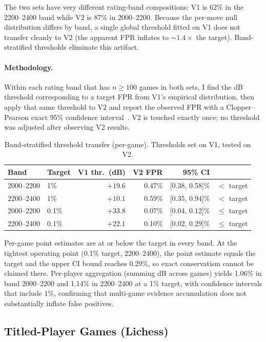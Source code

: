 \documentclass[11pt,a4paper]{article}
\theoremstyle{definition}
\begin{document}
\noindent The two sets have very different rating-band compositions:
V1 is 62\% in the 2200--2400 band while V2 is 87\% in 2000--2200.
Because the per-move null distribution differs by band, a single
global threshold fitted on V1 does not transfer cleanly to V2 (the
apparent FPR inflates to $\sim\!1.4\times$ the target).
Band-stratified thresholds eliminate this artifact.

\paragraph{Methodology.}
Within each rating band that has $n \ge 100$ games in both sets, I find
the dB threshold corresponding to a target FPR from V1's empirical
distribution, then apply that same threshold to V2 and report the
observed FPR with a Clopper--Pearson exact 95\% confidence
interval~\citep{clopper1934use}.
V2 is touched exactly once; no threshold was adjusted after observing
V2 results.

\begin{table}[h]
\centering
\small
\caption{Band-stratified threshold transfer (per-game).
  Thresholds set on V1, tested on V2.}
\label{tab:v1v2}
\begin{tabular}{llrrrl}
\toprule
Band & Target & V1 thr.\ (dB) & V2 FPR & 95\% CI & \\
\midrule
2000--2200 & 1\%   & $+19.6$ & 0.47\% & [0.38, 0.58]\% & $< $ target \\
2200--2400 & 1\%   & $+10.1$ & 0.59\% & [0.35, 0.94]\% & $< $ target \\
2000--2200 & 0.1\% & $+33.8$ & 0.07\% & [0.04, 0.12]\% & $\le$ target \\
2200--2400 & 0.1\% & $+22.1$ & 0.10\% & [0.02, 0.29]\% & $\le$ target \\
\bottomrule
\end{tabular}
\end{table}

\noindent Per-game point estimates are at or below the target in every
band.  At the tightest operating point (0.1\% target, 2200--2400), the
point estimate equals the target and the upper CI bound reaches 0.29\%,
so exact conservatism cannot be claimed there.  Per-player aggregation
(summing dB across games) yields 1.06\% in band 2000--2200 and 1.14\%
in 2200--2400 at a 1\% target, with confidence intervals that include
1\%, confirming that multi-game evidence accumulation does not
substantially inflate false positives.

\subsection{Titled-Player Games (Lichess)}
\label{sec:titled}
\end{document}
